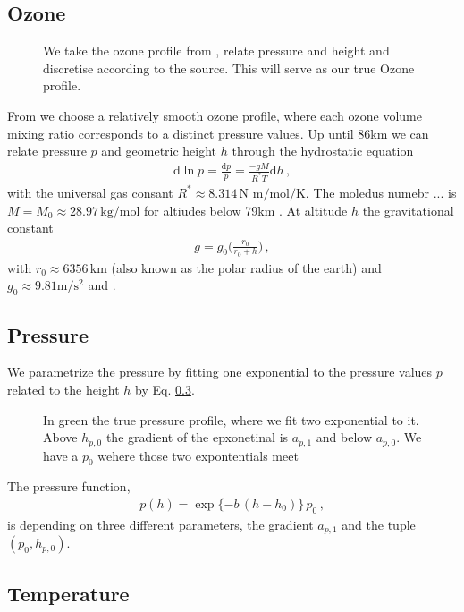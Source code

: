 \subsection{Ozone}
\begin{figure}[ht!]
	\centering
	\caption{We take the ozone profile from \cite{}, relate pressure and height and discretise according to the source.
		This will serve as our true Ozone profile.}
	\label{fig:nter-label}
\end{figure}
From \cite{} we choose a relatively smooth ozone profile, where each ozone volume mixing ratio corresponds to a distinct pressure values.
Up until $86$km we can relate pressure $p$ and geometric height $h$ through the hydrostatic equation
\begin{align}
	\text{d} \ln p= \frac{\text{d}p}{p} = \frac{- g M}{R^* T} \text{d} h \, ,
\end{align}
with the universal gas consant $R^* \approx 8.314  \, \text{N m} / \text{mol} / \text{K}$. The moledus numebr ... is $M = M_0 \approx 28.97 \, \text{kg}/\text{mol}$ for altiudes below 79km \cite{}.
At altitude $h$ the gravitational constant
\begin{align}
	g = g_0 \Bigg( \frac{r_0}{r_0 + h} \Bigg) \, ,
\end{align}
with $r_0 \approx 6356 \, \text{km}$ (also known as the polar radius of the earth) and $g_0 \approx 9.81 \text{m}/\text{s}^2$ and \cite{}.
\subsection{Pressure}
We parametrize the pressure by fitting one exponential to the pressure values $p$ related to the height $h$ by Eq. \ref{}.
\begin{figure}[ht!]
	\centering
	\caption{In green the true pressure profile, where we fit two exponential to it.
		Above $h_{p,0}$ the gradient of the epxonetinal is $a_{p,1}$ and below $a_{p,0}$.
		We have a $p_0$ wehere those two expontentials meet}
	\label{fig:nter-label}
\end{figure}
The pressure function,
\begin{align}
	p(h) =
		\exp{ \{ -b \,  (h - h_{0} ) \} } \,  p_0 \, ,
\end{align}
is depending on three different parameters, the gradient $a_{p,1}$ and the tuple $(p_0,h_{p,0})$.


\subsection{Temperature}

